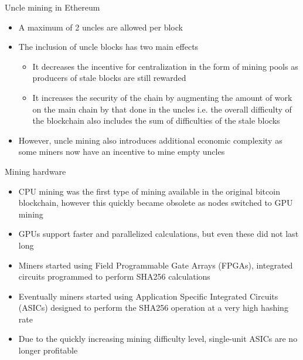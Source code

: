 \documentclass[10pt]{beamer}
\begin{document}

\begin{frame}{Uncle mining in Ethereum}
	\begin{itemize}
		\item A maximum of 2 uncles are allowed per block
		\item The inclusion of uncle blocks has two main effects
		\begin{itemize}
			\item It decreases the incentive for centralization in the form of mining pools as producers of stale blocks are still rewarded
			\item It increases the security of the chain by augmenting the amount of work on the main chain by that done in the uncles i.e. the overall difficulty of the blockchain also includes the sum of difficulties of the stale blocks
		\end{itemize}
		\item However, uncle mining also introduces additional economic complexity as some miners now have an incentive to mine empty uncles
	\end{itemize}
\end{frame}


\begin{frame}{Mining hardware}
	\begin{itemize}
		\item CPU mining was the first type of mining available in the original bitcoin blockchain, however this quickly became obsolete as nodes switched to GPU mining
		\item GPUs support faster and parallelized calculations, but even these did not last long
		\item Miners started using Field Programmable Gate Arrays (FPGAs), integrated circuits programmed to perform SHA256 calculations
		\item Eventually miners started using Application Specific Integrated Circuits (ASICs) designed to perform the SHA256 operation at a very high hashing rate
		\item Due to the quickly increasing mining difficulty level, single-unit ASICs are no longer profitable
	\end{itemize}
\end{frame}

\end{document}
